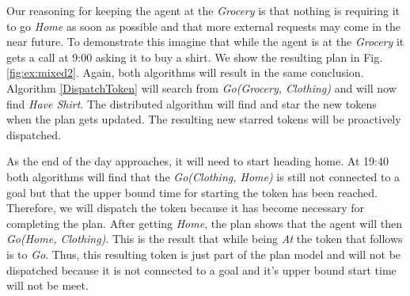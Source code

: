 Our reasoning for keeping the agent at the {\em Grocery} is that nothing is requiring it to go {\em Home}
as soon as possible and that more external requests may come in the near future. To demonstrate this imagine 
that while the agent is at the {\em Grocery} it gets a call at 9:00 asking it to buy a shirt.  We show the resulting plan 
in Fig. \ref{fig:ex:mixed2}. Again, both algorithms will result in the same conclusion. Algorithm \ref{DispatchToken}
will search from {\em Go(Grocery, Clothing)} and will now find {\em Have Shirt}. The distributed algorithm will find
and star the new tokens when the plan gets updated. The resulting new starred tokens will be proactively dispatched.

As the end of the day approaches, it will need to start heading home. At 19:40 both algorithms will find
that the {\em Go(Clothing, Home)} is still not connected to a goal but that the upper bound time for starting the token
has been reached. Therefore, we will dispatch the token because it has become necessary for completing the plan.
After getting {\em Home}, the plan shows that the agent will then {\em Go(Home, Clothing)}. This is the result that while
being {\em At} the token that follows is to {\em Go}. Thus, this resulting token is just part of the plan model and 
will not be dispatched because it is not connected to a goal and it's upper bound start time will not be meet.



